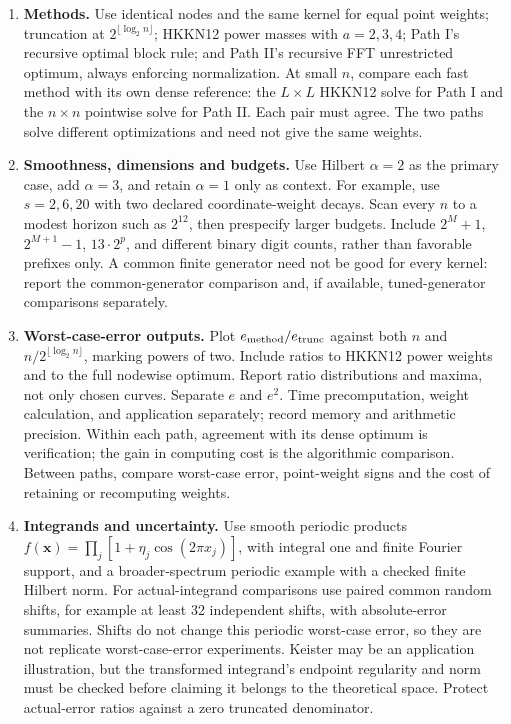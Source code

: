 \documentclass[11pt]{article}
\newcommand{\bx}{\boldsymbol{x}}
\begin{document}
\begin{enumerate}
\item \textbf{Methods.}
Use identical nodes and the same kernel for equal point weights;
truncation at $2^{\lfloor\log_2n\rfloor}$; HKKN12 power masses with
$a=2,3,4$; Path I's recursive optimal block rule; and Path II's
recursive FFT unrestricted optimum, always enforcing normalization.
At small $n$, compare each fast method with its own dense reference:
the $L\times L$ HKKN12 solve for Path I and the $n\times n$
pointwise solve for Path II. Each pair must agree. The two paths
solve different optimizations and need not give the same weights.

\item \textbf{Smoothness, dimensions and budgets.}
Use Hilbert $\alpha=2$ as the primary case, add $\alpha=3$, and retain
$\alpha=1$ only as context.
For example, use $s=2,6,20$ with two declared coordinate-weight decays.
Scan every $n$ to a modest horizon such as $2^{12}$, then prespecify
larger budgets. Include $2^M+1$, $2^{M+1}-1$, $13\cdot2^p$, and
different binary digit counts, rather than favorable prefixes only.
A common finite generator need not be good for every kernel:
report the common-generator comparison and, if available,
tuned-generator comparisons separately.

\item \textbf{Worst-case-error outputs.}
Plot $e_{\rm method}/e_{\rm trunc}$ against both $n$ and
$n/2^{\lfloor\log_2n\rfloor}$, marking powers of two.
Include ratios to HKKN12 power weights and to the full nodewise
optimum. Report ratio distributions and maxima, not only chosen curves.
Separate $e$ and $e^2$. Time precomputation, weight calculation, and
application separately; record memory and arithmetic precision.
Within each path, agreement with its dense optimum is verification;
the gain in computing cost is the algorithmic comparison. Between
paths, compare worst-case error, point-weight signs and the cost of
retaining or recomputing weights.

\item \textbf{Integrands and uncertainty.}
Use smooth periodic products
$f(\bx)=\prod_j[1+\eta_j\cos(2\pi x_j)]$, with integral one and finite
Fourier support, and a broader-spectrum periodic example with a
checked finite Hilbert norm.
For actual-integrand comparisons use paired common random shifts,
for example at least 32 independent shifts, with absolute-error
summaries. Shifts do not change this periodic worst-case error,
so they are not replicate worst-case-error experiments.
Keister may be an application illustration, but the transformed
integrand's endpoint regularity and norm must be checked before
claiming it belongs to the theoretical space.
Protect actual-error ratios against a zero truncated denominator.


\end{enumerate}
\end{document}
